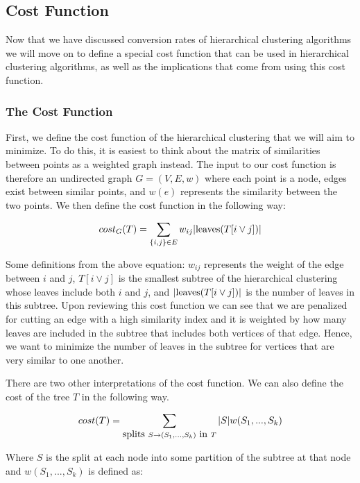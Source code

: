 \subsection{Cost Function}
Now that we have discussed conversion rates of hierarchical clustering algorithms we will move on to define a special cost function that can be used in hierarchical clustering algorithms, as well as the implications that come from using this cost function.
\subsubsection{The Cost Function}

First, we define the cost function of the hierarchical clustering that we will aim to minimize. To do this, it is easiest to think about the matrix of similarities between points as a weighted graph instead. The input to our cost function is therefore an undirected graph $G = (V, E, w)$ where each point is a node, edges exist between similar points, and $w(e)$ represents the similarity between the two points. We then define the cost function in the following way:

\begin{definition}[$cost_G$]
$$cost_G(T) = \sum_{\{i, j\} \in E}w_{ij}|\hbox{leaves}(T[i \vee j])|$$
\end{definition}

Some definitions from the above equation: $w_{ij}$ represents the weight of the edge between $i$ and $j$, $T[i \vee j]$ is the smallest subtree of the hierarchical clustering whose leaves include both $i$ and $j$, and $|\hbox{leaves}(T[i \vee j])|$ is the number of leaves in this subtree. Upon reviewing this cost function we can see that we are penalized for cutting an edge with a high similarity index and it is weighted by how many leaves are included in the subtree that includes both vertices of that edge. Hence, we want to minimize the number of leaves in the subtree for vertices that are very similar to one another.

There are two other interpretations of the cost function. We can also define the cost of the tree $T$ in the following way.

\begin{definition}[cost]
$$cost(T) = \sum_{\hbox{splits } S \rightarrow (S_1, ..., S_k) \hbox{ in } T} |S| w(S_1, ..., S_k)$$
\end{definition}

Where $S$ is the split at each node into some partition of the subtree at that node and $w(S_1, ..., S_k)$ is defined as:

